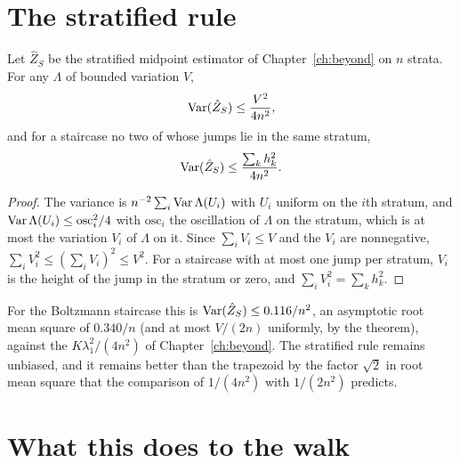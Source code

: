 \section{The stratified rule}

\begin{theorem}
\label{thm:stratbv}
Let $\hat Z_S$ be the stratified midpoint estimator of Chapter~\ref{ch:beyond} on $n$ strata. For any $\Lambda$ of bounded variation $V$,
\[
\operatorname{Var}(\hat Z_S) \le \frac{ V^2 }{ 4 n^2 } ,
\]
and for a staircase no two of whose jumps lie in the same stratum,
\[
\operatorname{Var}(\hat Z_S) \le \frac{ \sum_k h_k^2 }{ 4 n^2 } .
\]
\end{theorem}

\begin{proof}
The variance is $n^{-2} \sum_i \operatorname{Var} \Lambda(U_i)$ with $U_i$ uniform on the $i$th stratum, and $\operatorname{Var} \Lambda(U_i) \le \mathrm{osc}_i^2 / 4$ with $\mathrm{osc}_i$ the oscillation of $\Lambda$ on the stratum, which is at most the variation $V_i$ of $\Lambda$ on it. Since $\sum_i V_i \le V$ and the $V_i$ are nonnegative, $\sum_i V_i^2 \le (\sum_i V_i)^2 \le V^2$. For a staircase with at most one jump per stratum, $V_i$ is the height of the jump in the stratum or zero, and $\sum_i V_i^2 = \sum_k h_k^2$.
\end{proof}

For the Boltzmann staircase this is $\operatorname{Var}(\hat Z_S) \le 0.116 / n^2$, an asymptotic root mean square of $0.340 / n$ (and at most $V/(2n)$ uniformly, by the theorem), against the $K \lambda_1^2 / (4 n^2)$ of Chapter~\ref{ch:beyond}. The stratified rule remains unbiased, and it remains better than the trapezoid by the factor $\sqrt 2$ in root mean square that the comparison of $1/(4 n^2)$ with $1 / (2 n^2)$ predicts.

\section{What this does to the walk}

